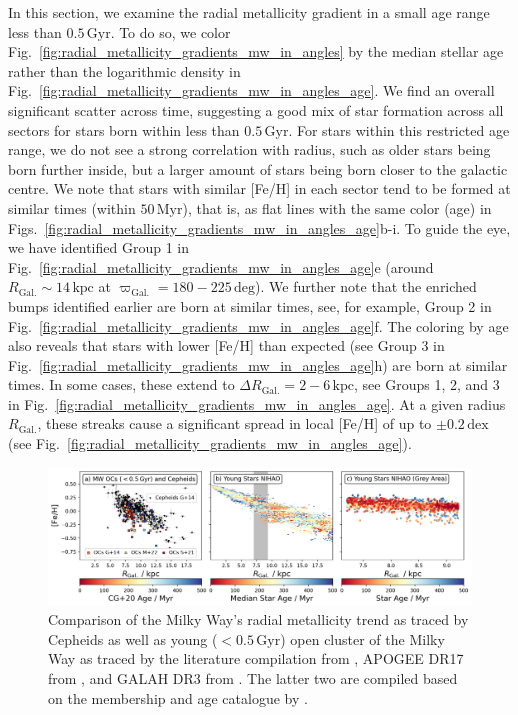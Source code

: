 \documentclass[twocolumn,apj,numberedappendix,appendixfloats]{openjournal}
\newcommand{\nihaoAGEmax}{$0.5\,\mathrm{Gyr}$}
\begin{document}
\begin{CJK*}{UTF8}{gbsn}
In this section, we examine the radial metallicity gradient in a small age range less than \nihaoAGEmax. To do so, we color Fig.~\ref{fig:radial_metallicity_gradients_mw_in_angles} by the median stellar age rather than the logarithmic density in Fig.~\ref{fig:radial_metallicity_gradients_mw_in_angles_age}. We find an overall significant scatter across time, suggesting a good mix of star formation across all sectors for stars born within less than \nihaoAGEmax. For stars within this restricted age range, we do not see a strong correlation with radius, such as older stars being born further inside, but a larger amount of stars being born closer to the galactic centre. We note that stars with similar [Fe/H] in each sector tend to be formed at similar times (within $50\,\mathrm{Myr}$), that is, as flat lines with the same color (age) in Figs.~\ref{fig:radial_metallicity_gradients_mw_in_angles_age}b-i. To guide the eye, we have identified Group 1 in Fig.~\ref{fig:radial_metallicity_gradients_mw_in_angles_age}e (around $R_\mathrm{Gal.} \sim 14\,\mathrm{kpc}$ at $\varpi_\mathrm{Gal.} = 180-225\,\mathrm{deg}$). We further note that the enriched bumps identified earlier are born at similar times, see, for example, Group 2 in Fig.~\ref{fig:radial_metallicity_gradients_mw_in_angles_age}f. The coloring by age also reveals that stars with lower [Fe/H] than expected (see Group 3 in Fig.~\ref{fig:radial_metallicity_gradients_mw_in_angles_age}h) are born at similar times. In some cases, these extend to $\Delta R_\mathrm{Gal.} = 2-6\,\mathrm{kpc}$, see Groups 1, 2, and 3 in Fig.~\ref{fig:radial_metallicity_gradients_mw_in_angles_age}. At a given radius $R_\mathrm{Gal.}$, these streaks cause a significant spread in local [Fe/H] of up to $\pm 0.2\,\mathrm{dex}$ (see Fig.~\ref{fig:radial_metallicity_gradients_mw_in_angles_age}).

\begin{figure}
    \centering
    \includegraphics[width=\textwidth]{figures/radial_metallicity_gradients_mw_vs_nihao.png}
    \caption{Comparison of the Milky Way's radial metallicity trend as traced by Cepheids \citep[black triangles, compiled from literature by][G+14]{Genovali2014} as well as young ($<$\nihaoAGEmax) open cluster of the Milky Way as traced by the literature compilation from \citet[][G+14 as squares]{Genovali2014}, APOGEE DR17 from \citet[][M+22 as crosses]{Myers2022}, and GALAH DR3 from \citet[][S+21 as circles]{Spina2021}. The latter two are compiled based on the membership and age catalogue by \citet[][CG+20]{CantatGaudin2020}.
    }
    \label{fig:radial_metallicity_gradients_mw_vs_nihao}
\end{figure}


\end{CJK*}
\end{document}

